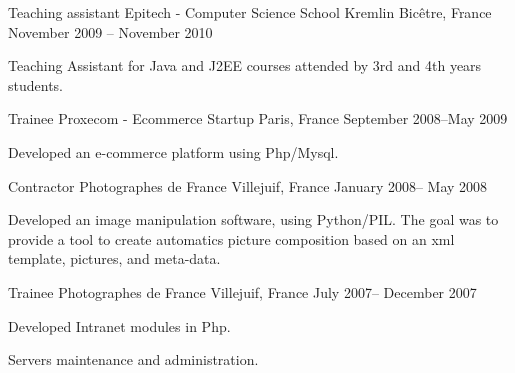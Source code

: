 \begin{cventries}
  \cventry
    {Teaching assistant} %
    {Epitech - Computer Science School} %
    {Kremlin Bicêtre, France} %
    {November 2009 – November 2010} %
    {
      \begin{cvitems} %
        \item {Teaching Assistant for Java and J2EE courses attended by 3rd and 4th years students.}
      \end{cvitems}
    }

  \cventry
    {Trainee} %
    {Proxecom - Ecommerce Startup} %
    {Paris, France} %
    {September 2008–May 2009} %
    {
      \begin{cvitems} %
        \item {Developed an e-commerce platform using Php/Mysql.}
      \end{cvitems}
    }

  \cventry
    {Contractor} %
    {Photographes de France} %
    {Villejuif, France} %
    {January 2008– May 2008} %
    {
      \begin{cvitems} %
        \item {Developed an image manipulation software, using Python/PIL.
The goal was to provide a tool to create automatics picture composition based on an xml template, pictures, and meta-data.}
        \end{cvitems}
    }

  \cventry
    {Trainee} %
    {Photographes de France} %
    {Villejuif, France} %
    {July 2007– December 2007} %
    {
      \begin{cvitems} %
        \item {Developed Intranet modules in Php.}
        \item {Servers maintenance and administration.}
      \end{cvitems}
    }

\end{cventries}
